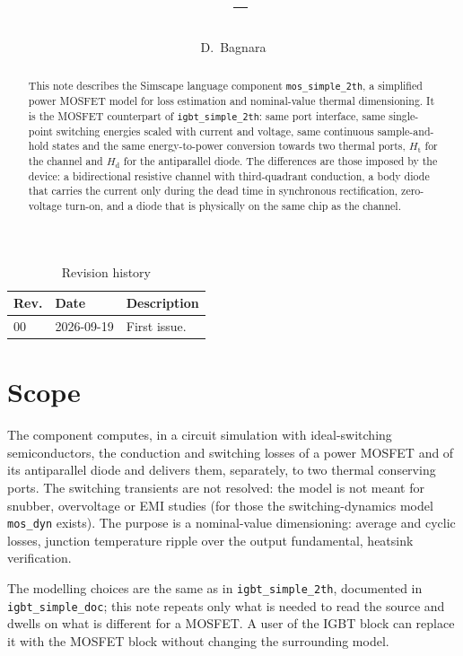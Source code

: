 \documentclass[11pt,a4paper]{article}
\title{\DocTitle\\[0.6em]{\large \Rev\ -- \RevDate}}
\author{D.~Bagnara}
\date{}
\newcommand{\RevDate}{2026-09-19}
\newcommand{\Ht}{H_{\mathrm{t}}}
\newcommand{\Hd}{H_{\mathrm{d}}}
\newcommand{\code}[1]{\texttt{#1}}
\begin{document}
\maketitle
\thispagestyle{fancy}

\begin{abstract}
\noindent
This note describes the Simscape language component \code{mos\_simple\_2th}, a
simplified power MOSFET model for loss estimation and nominal-value thermal
dimensioning. It is the MOSFET counterpart of \code{igbt\_simple\_2th}: same
port interface, same single-point switching energies scaled with current and
voltage, same continuous sample-and-hold states and the same
energy-to-power conversion towards two thermal ports, $\Ht$ for the channel
and $\Hd$ for the antiparallel diode. The differences are those imposed by the
device: a bidirectional resistive channel with third-quadrant conduction, a
body diode that carries the current only during the dead time in synchronous
rectification, zero-voltage turn-on, and a diode that is physically on the
same chip as the channel.
\end{abstract}

\begin{table}[h]
\centering
\caption*{Revision history}
\begin{tabular}{@{}lll@{}}
\toprule
Rev. & Date & Description \\
\midrule
00 & \RevDate & First issue. \\
\bottomrule
\end{tabular}
\end{table}

\tableofcontents

\section{Scope}

The component computes, in a circuit simulation with ideal-switching
semiconductors, the conduction and switching losses of a power MOSFET and of
its antiparallel diode and delivers them, separately, to two thermal
conserving ports. The switching transients are not resolved: the model is not
meant for snubber, overvoltage or EMI studies (for those the switching-dynamics
model \code{mos\_dyn} exists). The purpose is a nominal-value dimensioning:
average and cyclic losses, junction temperature ripple over the output
fundamental, heatsink verification.

The modelling choices are the same as in \code{igbt\_simple\_2th}, documented
in \code{igbt\_simple\_doc}; this note repeats only what is needed to read
the source and dwells on what is different for a MOSFET. A user of the IGBT
block can replace it with the MOSFET block without changing the surrounding
model.
\end{document}
